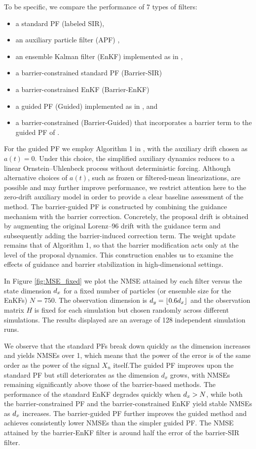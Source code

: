 \documentclass[onefignum,onetabnum]{siamonline250211}%
\begin{document}
To be specific, we compare the performance of 7 types of filters:
\begin{itemize}
\item a standard PF (labeled SIR),
\item an auxiliary particle filter (APF) \cite{Pitt01},
\item an ensemble Kalman filter (EnKF) \cite{Evensen03} implemented as in \cite{Perez-Vieites18},
\item a barrier-constrained standard PF (Barrier-SIR)
\item a barrier-constrained EnKF (Barrier-EnKF)
\item a guided PF (Guided) implemented as in \cite{Pieper-Sethmacher25b}, and
\item a barrier-constrained (Barrier-Guided) that incorporates a barrier term to the guided PF of \cite{Pieper-Sethmacher25b}.
\end{itemize}
For the guided PF we employ Algorithm 1 in \cite{Pieper-Sethmacher25b}, with the auxiliary drift chosen as $a(t)=0$. Under this choice, the simplified auxiliary dynamics reduces to a linear Ornstein–Uhlenbeck process without deterministic forcing. Although alternative choices of 
$a(t)$, such as frozen or filtered-mean linearizations, are possible and may further improve performance, we restrict attention here to the zero-drift auxiliary model in order to provide a clear baseline assessment of the method. %
The barrier-guided PF is constructed by combining the guidance mechanism with the barrier correction. Concretely, the proposal drift is obtained by augmenting the original Lorenz–96 drift with the guidance term and subsequently adding the barrier-induced correction term. The weight update remains that of Algorithm 1, so that the barrier modification acts only at the level of the proposal dynamics. This construction enables us to examine the effects of guidance and barrier stabilization in high-dimensional settings.


In Figure \ref{fig:MSE_fixed} we plot the NMSE attained by each filter versus the state dimension $d_x$ for a fixed number of particles (or ensemble size for the EnKFs) $N=750$. The observation dimension is $d_y = \lfloor 0.6d_x \rfloor$ and the observation matrix $H$ is fixed for each simulation but chosen randomly across different simulations. The results displayed are an average of 128 independent simulation runs.

We observe that the standard PFs break down quickly as the dimension increases and yields NMSEs over 1, which means that the power of the error is of the same order as the power of the signal $X_n$ itself.The guided PF improves upon the standard PF but still deteriorates as the dimension $d_x$ grows, with NMSEs remaining significantly above those of the barrier-based methods. The performance of the standard EnKF degrades quickly when $d_x > N$, while both the barrier-constrained PF and the barrier-constrained EnKF yield stable NMSEs as $d_x$ increases. The barrier-guided PF further improves the guided method and achieves consistently lower NMSEs than the simpler guided PF. The NMSE attained by the barrier-EnKF filter is around half the error of the barrier-SIR filter. 
\end{document}
